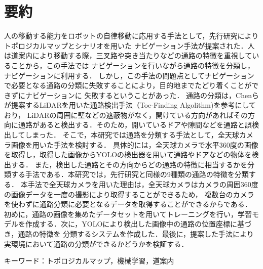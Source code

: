 \documentclass[../main]{subfiles}
\begin{document}
 \chapter*{要約}
    人の移動する能力をロボットの自律移動に応用する手法として，先行研究によりトポロジカルマップとシナリオを用いた
    ナビゲーション手法が提案された．人は道案内により移動する際，三叉路や突き当たりなどの通路の特徴を重視していることから，この手法では
    ナビゲーションを行いながら通路の特徴を分類し，ナビゲーションに利用する．
    しかし，この手法の問題点としてナビゲーションで必要となる通路の分類に失敗することにより，目的地までたどり着くことができずにナビゲーションに
    失敗するということがあった．
    通路の分類は，Chenらが提案するLiDARを用いた通路検出手法（Toe-Finding Algolithm)\cite{toe_finding_algolithm}を参考にしており，
    LiDARの周囲に壁などの遮蔽物がなく，開けている方向があればその方向に通路があると検出する．そのため，開いているドアや隙間などを通路と誤検出してしまった．
    そこで，本研究では通路を分類する手法として，全天球カメラ画像を用いた手法を検討する．
    具体的には，全天球カメラで水平360度の画像を取得し，取得した画像からYOLOの検出器を用いて通路やドアなどの物体を検出する．
    また，検出した通路とその方向からどの通路の特徴に相当するかを分類する手法である．本研究では，先行研究と同様の9種類の通路の特徴を分類する．
    本手法で全天球カメラを用いた理由は，全天球カメラはカメラの周囲360度の画像データを一度の撮影により取得することができるため，
    複数台のカメラを使わずに通路分類に必要となるデータを取得することができるからである．
    初めに，通路の画像を集めたデータセットを用いてトレーニングを行い，学習モデルを作成する．次に，YOLOにより検出した画像中の通路の位置座標に基づき，通路の特徴を
    分類するシステムを作成した．最後に，提案した手法により実環境において通路の分類ができるかどうかを検証する．\\
    \vspace{0.5cm}

    キーワード：トポロジカルマップ，機械学習，道案内
\end{document}

